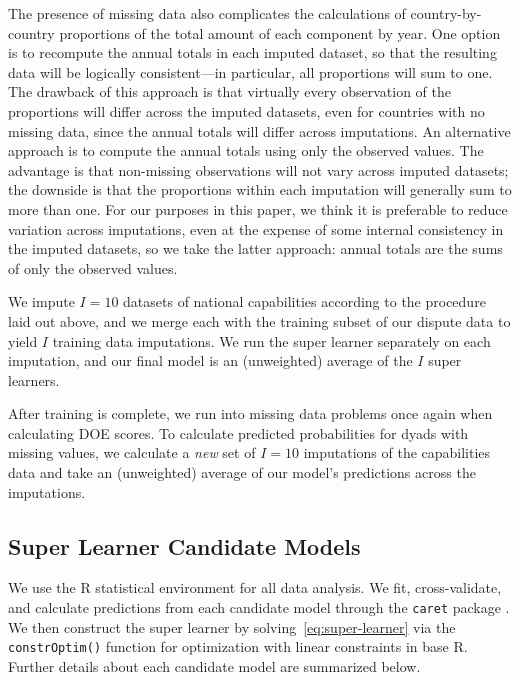 The presence of missing data also complicates the calculations of country-by-country proportions of the total amount of each component by year.
One option is to recompute the annual totals in each imputed dataset, so that the resulting data will be logically consistent---in particular, all proportions will sum to one.
The drawback of this approach is that virtually every observation of the proportions will differ across the imputed datasets, even for countries with no missing data, since the annual totals will differ across imputations.
An alternative approach is to compute the annual totals using only the observed values.
The advantage is that non-missing observations will not vary across imputed datasets; the downside is that the proportions within each imputation will generally sum to more than one.
For our purposes in this paper, we think it is preferable to reduce variation across imputations, even at the expense of some internal consistency in the imputed datasets, so we take the latter approach: annual totals are the sums of only the observed values.

We impute $I = 10$ datasets of national capabilities according to the procedure laid out above, and we merge each with the training subset of our dispute data to yield $I$ training data imputations.
We run the super learner separately on each imputation, and our final model is an (unweighted) average of the $I$ super learners.

After training is complete, we run into missing data problems once again when calculating DOE scores.
To calculate predicted probabilities for dyads with missing values, we calculate a \emph{new} set of $I = 10$ imputations of the capabilities data and take an (unweighted) average of our model's predictions across the imputations.

\subsection{Super Learner Candidate Models}

We use the R statistical environment \citep{pkg-R} for all data analysis.
We fit, cross-validate, and calculate predictions from each candidate model through the \texttt{caret} package \citep{pkg-caret}.
We then construct the super learner by solving~\eqref{eq:super-learner} via the \texttt{constrOptim()} function for optimization with linear constraints in base R.
Further details about each candidate model are summarized below.

